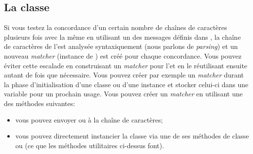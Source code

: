\documentclass[a4paper,10pt,twoside]{book}
\begin{document}
{%
\subsection{La classe }

Si vous testez la concordance d'un certain nombre de chaînes de
caractères plusieurs fois avec la même \expreg en utilisant un des
messages définis dans , la chaîne de caractères de
l'\expreg est analysée syntaxiquement
(nous parlons de \emph{parsing})
et un nouveau \emph{matcher}
(instance de )
est créé pour chaque concordance. Vous pouvez éviter cette escalade en
construisant un \emph{matcher} pour l'\expreg et en le réutilisant
ensuite autant de fois que nécessaire. Vous pouvez créer par exemple
un \emph{matcher} durant la phase d'initialisation d'une classe ou
d'une instance et stocker celui-ci dans une variable pour un
prochain usage. Vous pouvez créer un \emph{matcher} en utilisant une
des méthodes suivantes:

\begin{itemize}
\item vous pouvez envoyer  ou
   à la chaîne de caractères;
\item vous pouvez directement instancier la classe  via
  une de ses méthodes de classe  ou
   (ce que les méthodes
  utilitaires ci-dessus font).

%

\end{itemize}

}
\end{document}
